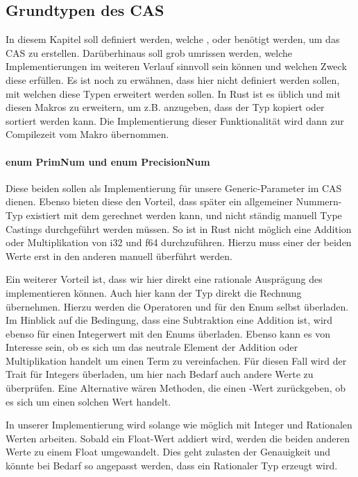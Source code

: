 \documentclass[11pt,a4paper, ngerman]{article}
\begin{document}
\subsection{Grundtypen des CAS}
In diesem Kapitel soll definiert werden, welche ,  oder  benötigt werden, um das CAS zu erstellen. Darüberhinaus soll grob umrissen werden, welche Implementierungen im weiteren Verlauf sinnvoll sein können und welchen Zweck diese erfüllen.
Es ist noch zu erwähnen, dass hier nicht definiert werden sollen, mit welchen  diese Typen erweitert werden sollen. In Rust ist es üblich  und  mit diesen Makros zu erweitern, um z.B. anzugeben, dass der Typ kopiert oder sortiert werden kann. Die Implementierung dieser Funktionalität wird dann zur Compilezeit vom Makro übernommen.

\paragraph{enum PrimNum und enum PrecisionNum} Diese beiden  sollen als Implementierung für unsere Generic-Parameter im CAS dienen. Ebenso bieten diese den Vorteil, dass später ein allgemeiner Nummern-Typ existiert mit dem gerechnet werden kann, und nicht ständig manuell Type Castings durchgeführt werden müssen. So ist in Rust nicht möglich eine Addition oder Multiplikation von i32 und f64 durchzuführen. Hierzu muss einer der beiden Werte erst in den anderen manuell überführt werden.

Ein weiterer Vorteil ist, dass wir hier direkt eine rationale Ausprägung des  implementieren können. Auch hier kann der Typ direkt die Rechnung übernehmen. Hierzu werden die Operatoren  und  für den Enum selbst überladen. Im Hinblick auf die Bedingung, dass eine Subtraktion eine Addition ist, wird ebenso  für einen Integerwert mit den Enums überladen. Ebenso kann es von Interesse sein, ob es sich um das neutrale Element der Addition oder Multiplikation handelt um einen Term zu vereinfachen. Für diesen Fall wird der Trait  für Integers überladen, um hier nach Bedarf auch andere Werte zu überprüfen. Eine Alternative wären Methoden, die einen -Wert zurückgeben, ob es sich um einen solchen Wert handelt.

In unserer Implementierung wird  solange wie möglich mit Integer und Rationalen Werten arbeiten. Sobald ein Float-Wert addiert wird, werden die beiden anderen Werte zu einem Float umgewandelt. Dies geht zulasten der Genauigkeit und könnte bei Bedarf so angepasst werden, dass ein Rationaler Typ erzeugt wird.
\end{document}
